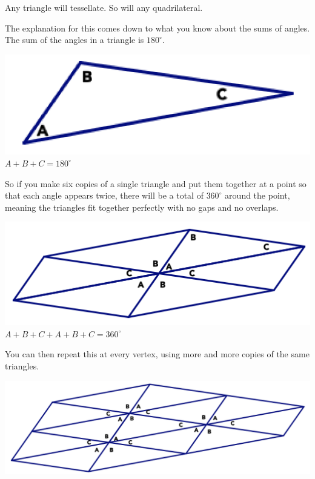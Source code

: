 \begin{thm*}
Any triangle will tessellate.  So will any quadrilateral.
\end{thm*}

The explanation for this comes down to what you know about the sums of angles.   The sum of the angles in a triangle is $180^\circ$. 

\begin{center}
\includegraphics[scale=0.55]{tesstri1}\\
$A+B+C=180^\circ$

\end{center}



 So if you make six copies of a single triangle and put them together at a point so that each angle appears twice, there will be a total of $360^\circ$ around the point, meaning the triangles fit together perfectly with no gaps and no overlaps.  

\begin{center}
\includegraphics[scale=0.55]{tesstri2}\\
$A+B+C + A+B+C=360^\circ$

\end{center}


You can then repeat this at every vertex, using more and more copies of the same triangles.

\begin{center}
\includegraphics[scale=0.55]{tesstri3}\\

\end{center}



